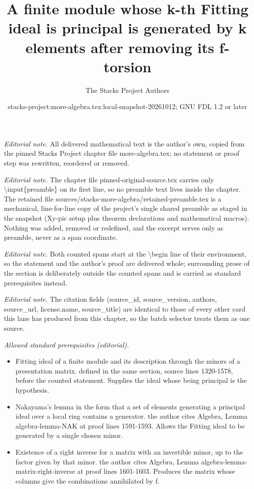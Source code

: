 \documentclass[10pt,a4paper]{amsart}
\title{A finite module whose k-th Fitting ideal is principal is generated by k elements after removing its f-torsion}
\author{The Stacks Project Authors}
\date{stacks-project:more-algebra.tex:local-snapshot-20261012; GNU FDL 1.2 or later}
\theoremstyle{plain}
\theoremstyle{definition}
\theoremstyle{remark}
\numberwithin{equation}{subsection}
\begin{document}
\maketitle
\setcounter{subsection}{1}
\noindent\textit{Editorial note.} All delivered mathematical text is the author's own, copied from the pinned Stacks Project chapter file more-algebra.tex; no statement or proof step was rewritten, reordered or removed.\par\medskip
\noindent\textit{Editorial note.} The chapter file pinned-original-source.tex carries only \textbackslash{}input\{preamble\} on its first line, so no preamble text lives inside the chapter. The retained file sources/stacks-more-algebra/retained-preamble.tex is a mechanical, line-for-line copy of the project's single shared preamble as staged in the snapshot (Xy-pic setup plus theorem declarations and mathematical macros). Nothing was added, removed or redefined, and the excerpt serves only as preamble, never as a span coordinate.\par\medskip
\noindent\textit{Editorial note.} Both counted spans start at the \textbackslash{}begin line of their environment, so the statement and the author's proof are delivered whole; surrounding prose of the section is deliberately outside the counted spans and is carried as standard prerequisites instead.\par\medskip
\noindent\textit{Editorial note.} The citation fields (source\_id, source\_version, authors, source\_url, license.name, source\_title) are identical to those of every other card this lane has produced from this chapter, so the batch selector treats them as one source.\par\medskip
\noindent\textit{Allowed standard prerequisites (editorial).}\begin{itemize}
\item Fitting ideal of a finite module and its description through the minors of a presentation matrix. defined in the same section, source lines 1320-1578, before the counted statement. Supplies the ideal whose being principal is the hypothesis.
\item Nakayama's lemma in the form that a set of elements generating a principal ideal over a local ring contains a generator. the author cites Algebra, Lemma algebra-lemma-NAK at proof lines 1591-1593. Allows the Fitting ideal to be generated by a single chosen minor.
\item Existence of a right inverse for a matrix with an invertible minor, up to the factor given by that minor. the author cites Algebra, Lemma algebra-lemma-matrix-right-inverse at proof lines 1601-1603. Produces the matrix whose columns give the combinations annihilated by f.
\end{itemize}\medskip
\end{document}

